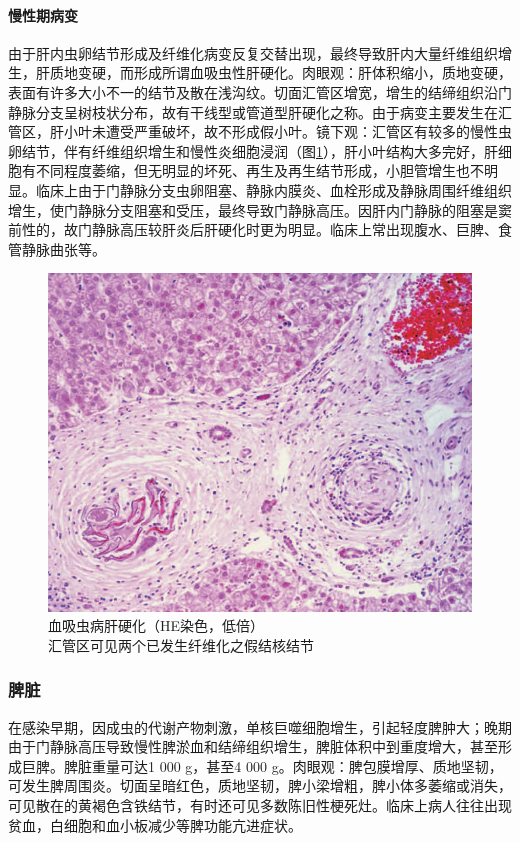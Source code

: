 \paragraph{慢性期病变}
由于肝内虫卵结节形成及纤维化病变反复交替出现，最终导致肝内大量纤维组织增生，肝质地变硬，而形成所谓血吸虫性肝硬化。肉眼观：肝体积缩小，质地变硬，表面有许多大小不一的结节及散在浅沟纹。切面汇管区增宽，增生的结缔组织沿门静脉分支呈树枝状分布，故有干线型或管道型肝硬化之称。由于病变主要发生在汇管区，肝小叶未遭受严重破坏，故不形成假小叶。镜下观：汇管区有较多的慢性虫卵结节，伴有纤维组织增生和慢性炎细胞浸润（图\ref{fig15-7}），肝小叶结构大多完好，肝细胞有不同程度萎缩，但无明显的坏死、再生及再生结节形成，小胆管增生也不明显。临床上由于门静脉分支虫卵阻塞、静脉内膜炎、血栓形成及静脉周围纤维组织增生，使门静脉分支阻塞和受压，最终导致门静脉高压。因肝内门静脉的阻塞是窦前性的，故门静脉高压较肝炎后肝硬化时更为明显。临床上常出现腹水、巨脾、食管静脉曲张等。

\begin{figure}[!htbp]
 \centering
 \includegraphics{./images/Image00251.jpg}
 \captionsetup{justification=centering}
 \caption{血吸虫病肝硬化（HE染色，低倍）\\ {\small 汇管区可见两个已发生纤维化之假结核结节}}
\label{fig15-7}
  \end{figure}

\subsubsection{脾脏}

在感染早期，因成虫的代谢产物刺激，单核巨噬细胞增生，引起轻度脾肿大；晚期由于门静脉高压导致慢性脾淤血和结缔组织增生，脾脏体积中到重度增大，甚至形成巨脾。脾脏重量可达1
000 g，甚至4 000
g。肉眼观：脾包膜增厚、质地坚韧，可发生脾周围炎。切面呈暗红色，质地坚韧，脾小梁增粗，脾小体多萎缩或消失，可见散在的黄褐色含铁结节，有时还可见多数陈旧性梗死灶。临床上病人往往出现贫血，白细胞和血小板减少等脾功能亢进症状。

